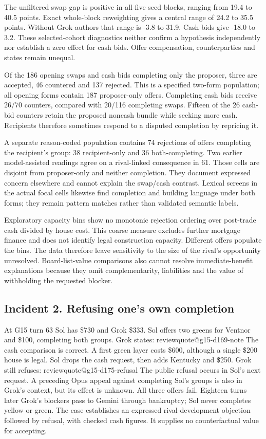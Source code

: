 \documentclass[11pt,letterpaper]{article}
\makeatletter
\newcommand{\q}[1]{\csname reviewquote@#1\endcsname}
\makeatother
\begin{document}
The unfiltered swap gap is positive in all five seed blocks, ranging from 19.4 to 40.5 points. Exact whole-block reweighting gives a central range of 24.2 to 35.5 points. Without Grok authors that range is -3.8 to 31.9. Cash bids give -18.0 to 3.2. These selected-cohort diagnostics neither confirm a hypothesis independently nor establish a zero effect for cash bids. Offer compensation, counterparties and states remain unequal.

Of the 186 opening swaps and cash bids completing only the proposer, three are accepted, 46 countered and 137 rejected. This is a specified two-form population; all opening forms contain 187 proposer-only offers. Completing cash bids receive 26/70 counters, compared with 20/116 completing swaps. Fifteen of the 26 cash-bid counters retain the proposed noncash bundle while seeking more cash. Recipients therefore sometimes respond to a disputed completion by repricing it.

A separate reason-coded population contains 74 rejections of offers completing the recipient's group: 38 recipient-only and 36 both-completing. Two earlier model-assisted readings agree on a rival-linked consequence in 61. Those cells are disjoint from proposer-only and neither completion. They document expressed concern elsewhere and cannot explain the swap/cash contrast. Lexical screens in the actual focal cells likewise find completion and building language under both forms; they remain pattern matches rather than validated semantic labels.

Exploratory capacity bins show no monotonic rejection ordering over post-trade cash divided by house cost. This coarse measure excludes further mortgage finance and does not identify legal construction capacity. Different offers populate the bins. The data therefore leave sensitivity to the size of the rival's opportunity unresolved. Board-list-value comparisons also cannot resolve immediate-benefit explanations because they omit complementarity, liabilities and the value of withholding the requested blocker.

\subsection{Incident 2. Refusing one's own completion}
At G15 turn 63 Sol has \$730 and Grok \$333. Sol offers two greens for Ventnor and \$100, completing both groups. Grok states:
\q{g15-d169-note}
The cash comparison is correct. A first green layer costs \$600, although a single \$200 house is legal. Sol drops the cash request, then adds Kentucky and \$250. Grok still refuses:
\q{g15-d175-refusal}
The public refusal occurs in Sol's next request. A preceding Opus appeal against completing Sol's groups is also in Grok's context, but its effect is unknown. All three offers fail. Eighteen turns later Grok's blockers pass to Gemini through bankruptcy; Sol never completes yellow or green. The case establishes an expressed rival-development objection followed by refusal, with checked cash figures. It supplies no counterfactual value for accepting.
\end{document}
